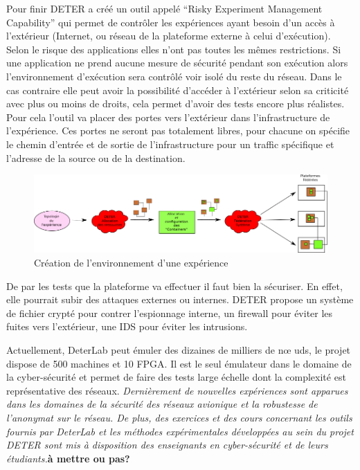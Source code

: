 Pour finir DETER a créé un outil appelé ``Risky Experiment Management
Capability'' qui permet de contrôler les expériences ayant besoin d'un
accès à l'extérieur (Internet, ou réseau de la plateforme externe à
celui d'exécution). Selon le risque des applications elles n'ont pas
toutes les mêmes restrictions. Si une application ne prend aucune
mesure de sécurité pendant son exécution alors l'environnement
d'exécution sera contrôlé voir isolé du reste du réseau. Dans le cas
contraire elle peut avoir la possibilité d'accéder à l'extérieur selon
sa criticité avec plus ou moins de droits, cela permet d'avoir des tests encore plus
réalistes. Pour cela l'outil va placer des portes vers l'extérieur
dans l'infrastructure de l'expérience. Ces portes ne seront pas
totalement libres, pour chacune on spécifie le chemin d'entrée et de
sortie de l'infrastructure pour un traffic spécifique et l'adresse de
la source ou de la destination.

\begin{figure}[H]
\centering
\includegraphics[scale=0.63]{Pictures/png/Deter_fonctionnement_general}
\caption{Création de l'environnement d'une expérience}
\label{Deter_fonc}
\end{figure}

De par les tests que la plateforme va effectuer il faut bien la
sécuriser. En effet, elle pourrait subir des attaques externes ou
internes. DETER propose un système de fichier crypté pour contrer
l'espionnage interne, un firewall pour éviter les fuites vers
l'extérieur, une IDS pour éviter les intrusions.

 Actuellement, DeterLab peut émuler des dizaines de milliers de n\oe
 uds, le projet dispose de 500 machines et 10 FPGA. Il est le seul
 émulateur dans le domaine de la cyber-sécurité et permet de faire des
 tests large échelle dont la complexité est représentative des
 réseaux. \textit{Dernièrement de nouvelles expériences sont apparues
   dans les domaines de la sécurité des réseaux avionique et la
   robustesse de l'anonymat sur le réseau. De plus, des exercices et
   des cours concernant les outils fournis par DeterLab et les
   méthodes expérimentales développées au sein du projet DETER sont
   mis à disposition des enseignants en cyber-sécurité et de leurs
   étudiants.}\textbf{à mettre ou pas?}
